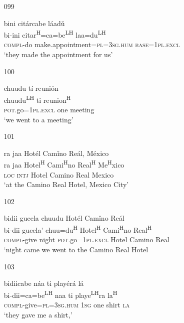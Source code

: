 \begin{itemize}
\item[099]
 
\glll   bini cit\'{a}rcabe l\'{a}ad\v{u}\\
bi-ini citar\textsuperscript{H}=ca=be\textsuperscript{LH}  laa=du\textsuperscript{LH} \\
\textsc{compl}-do make.appointment=\textsc{pl}=\textsc{3sg.hum} \textsc{base}=\textsc{1pl.excl}\\
\glt `they made the appointment for us' 
 


\item[100]
 
\glll   chuudu t\'{i} reuni\'{o}n\\
chuudu\textsuperscript{LH}  ti reunion\textsuperscript{H} \\
\textsc{pot}.go=\textsc{1pl.excl} one meeting\\
\glt `we went to a meeting'
 

\item[101]
 
\glll   ra jaa Hot\'{e}l Cam\v{i}no Re\'{a}l, M\'{e}xico\\
 ra jaa Hotel\textsuperscript{H} Cami\textsuperscript{H}no Real\textsuperscript{H} Me\textsuperscript{H}xico\\
 \textsc{loc} \textsc{intj} Hotel Camino Real Mexico\\
\glt `at the Camino Real Hotel, Mexico City'
 


\item[102]

\glll   bidii gueela chuudu Hot\'{e}l Cam\v{i}no Re\'{a}l \\
 bi-dii gueela' chuu=du\textsuperscript{H} Hotel\textsuperscript{H} Cami\textsuperscript{H}no Real\textsuperscript{H}\\ 
 \textsc{compl}-give night  \textsc{pot}.go=\textsc{1pl.excl} Hotel Camino Real \\
\glt `night came we went to the Camino Real Hotel
 

\item[103]
 
\glll   bidiicabe n\'{a}a ti play\'{e}r\'{a} l\'{a}\\
bi-dii=ca=be\textsuperscript{LH} naa ti playe\textsuperscript{LH}ra la\textsuperscript{H}\\
 \textsc{compl}-give=\textsc{pl}=\textsc{3sg.hum} \textsc{1sg} one shirt \textsc{la}\\
\glt `they gave me a shirt,'
 



\end{itemize}

